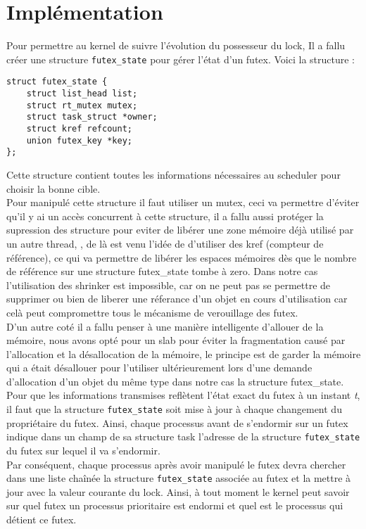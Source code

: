 \section*{Implémentation}

Pour permettre au kernel de suivre l'évolution du possesseur du lock, Il a
fallu créer une structure \verb|futex_state| pour gérer l'état d'un futex. 
Voici la structure :
\begin{lstlisting}
struct futex_state {
	struct list_head list;
	struct rt_mutex mutex;
	struct task_struct *owner;
	struct kref refcount;
	union futex_key *key;
};
\end{lstlisting}

Cette structure contient toutes les informations nécessaires au scheduler pour 
choisir la bonne cible.
\\
Pour manipulé cette structure il faut utiliser un mutex, ceci va permettre 
d'éviter qu'il y ai un accès concurrent à cette structure, il a fallu aussi 
protéger la supression des structure pour eviter de libérer une zone mémoire 
déjà utilisé par un autre thread, , de là est venu l'idée de d'utiliser des kref
(compteur de référence), ce qui va permettre de libérer les espaces mémoires dès
que le nombre de référence sur une structure futex\_state tombe à zero.
Dans notre cas l'utilisation des shrinker est impossible, car on ne peut pas se 
permettre de supprimer ou bien de liberer une réferance d'un objet en cours 
d'utilisation car celà peut compromettre tous le mécanisme de verouillage des 
futex.
\\

D'un autre coté il a fallu penser à une manière intelligente d'allouer de la 
mémoire, nous avons opté pour un slab pour éviter la fragmentation causé par 
l'allocation et la désallocation de la mémoire, le principe est de garder 
la mémoire qui a était désallouer pour l'utiliser ultérieurement lors d'une 
demande d'allocation d'un objet du même type dans notre cas la structure 
futex\_state.
\\

Pour que les informations transmises reflètent l'état exact du futex
à un instant \textit{t}, il faut que la structure \verb|futex_state| soit mise à jour
à chaque changement du propriétaire du futex. Ainsi, chaque processus avant de 
s'endormir sur un futex indique dans un champ de sa structure task l'adresse de 
la structure \verb|futex_state| du futex sur lequel il va s'endormir.
\\

Par conséquent, chaque processus après avoir manipulé le futex 
devra chercher dans une liste chaînée la structure \verb|futex_state| associée au 
futex et la mettre à jour avec la valeur courante du lock. Ainsi, à tout moment 
le kernel peut savoir sur quel futex un processus prioritaire est endormi et quel
est le processus qui détient ce futex.